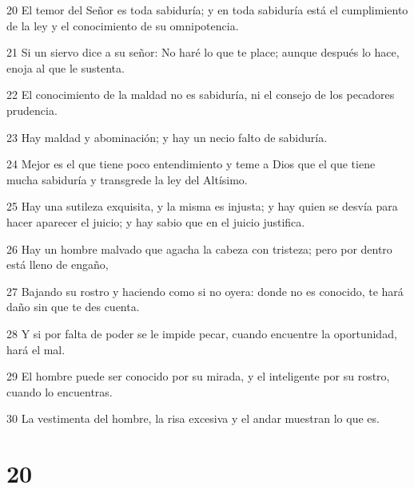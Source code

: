 \par 20 El temor del Señor es toda sabiduría; y en toda sabiduría está el cumplimiento de la ley y el conocimiento de su omnipotencia.
\par 21 Si un siervo dice a su señor: No haré lo que te place; aunque después lo hace, enoja al que le sustenta.
\par 22 El conocimiento de la maldad no es sabiduría, ni el consejo de los pecadores prudencia.
\par 23 Hay maldad y abominación; y hay un necio falto de sabiduría.
\par 24 Mejor es el que tiene poco entendimiento y teme a Dios que el que tiene mucha sabiduría y transgrede la ley del Altísimo.
\par 25 Hay una sutileza exquisita, y la misma es injusta; y hay quien se desvía para hacer aparecer el juicio; y hay sabio que en el juicio justifica.
\par 26 Hay un hombre malvado que agacha la cabeza con tristeza; pero por dentro está lleno de engaño,
\par 27 Bajando su rostro y haciendo como si no oyera: donde no es conocido, te hará daño sin que te des cuenta.
\par 28 Y si por falta de poder se le impide pecar, cuando encuentre la oportunidad, hará el mal.
\par 29 El hombre puede ser conocido por su mirada, y el inteligente por su rostro, cuando lo encuentras.
\par 30 La vestimenta del hombre, la risa excesiva y el andar muestran lo que es.

\chapter{20}

